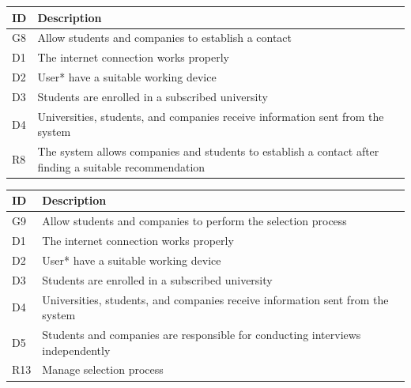 \begin{center}
    \begin{longtable}{|l|p{13.5cm}|}
        \hline
        \rowcolor[HTML]{5C8A99}
        \textbf{ID} & \textbf{Description} \\ \hline
        \rowcolor[HTML]{E7E0FA} %
        G8 & Allow students and companies to establish a contact \\ \hline
        \rowcolor[HTML]{FFF9C4} %
        D1 & The internet connection works properly \\ \hline
        \rowcolor[HTML]{FFF9C4} %
        D2 & User* have a suitable working device \\ \hline
        \rowcolor[HTML]{FFF9C4} %
        D3 & Students are enrolled in a subscribed university \\ \hline
        \rowcolor[HTML]{FFF9C4} %
        D4 & Universities, students, and companies receive information sent from the system \\ \hline
        \hline\rowcolor[HTML]{FFDAB9} %
        R8 & The system allows companies and students to establish a contact after finding a suitable recommendation \\ \hline
    \end{longtable}
\end{center}
\begin{center}
    \begin{longtable}{|l|p{13.5cm}|}
        \hline
        \rowcolor[HTML]{5C8A99}
        \textbf{ID} & \textbf{Description} \\ \hline
        \rowcolor[HTML]{E7E0FA} %
        G9 & Allow students and companies to perform the selection process \\ \hline
        \rowcolor[HTML]{FFF9C4} %
        D1 & The internet connection works properly \\ \hline
        \rowcolor[HTML]{FFF9C4} %
        D2 & User* have a suitable working device \\ \hline
        \rowcolor[HTML]{FFF9C4} %
        D3 & Students are enrolled in a subscribed university \\ \hline
        \rowcolor[HTML]{FFF9C4} %
        D4 & Universities, students, and companies receive information sent from the system \\ \hline
        \rowcolor[HTML]{FFF9C4} %
        D5 & Students and companies are responsible for conducting interviews independently \\ \hline
        \hline\rowcolor[HTML]{FFDAB9} %
        R13 & Manage selection process \\ \hline
    \end{longtable}
\end{center}

